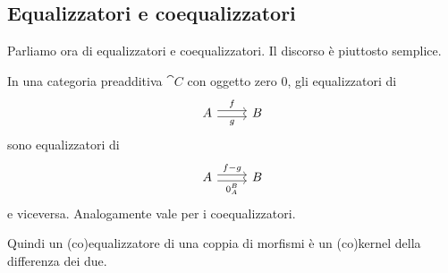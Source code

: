 \subsection{Equalizzatori e coequalizzatori}

Parliamo ora di equalizzatori e coequalizzatori. Il discorso è piuttosto
semplice.

\begin{proposition}\label{proposition:EqualizersAreKernels}
  In una categoria preadditiva \(\cat C\) con oggetto zero \(0\), gli
  equalizzatori di
  \[
    \begin{tikzcd}
      A \ar["f", r, shift left] \ar["g", r, shift right, swap] & B
    \end{tikzcd}
  \]
  sono equalizzatori di
  \[
    \begin{tikzcd}
      A \ar["{f-g}", r, shift left] \ar["{0_A^B}", r, shift right, swap]
      & B
    \end{tikzcd}
  \]
  e viceversa. Analogamente vale per i coequalizzatori.
\end{proposition}

Quindi un (co)equalizzatore di una coppia di morfismi è un (co)kernel
della differenza dei due.

